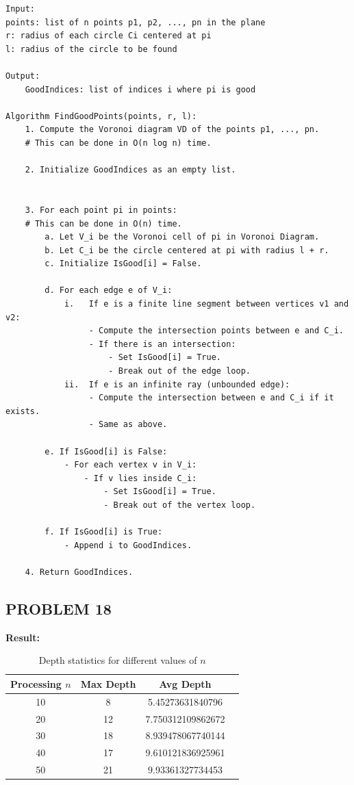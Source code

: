 \documentclass{article}
\begin{document}
\begin{verbatim}
Input: 
points: list of n points p1, p2, ..., pn in the plane
r: radius of each circle Ci centered at pi
l: radius of the circle to be found

Output: 
    GoodIndices: list of indices i where pi is good

Algorithm FindGoodPoints(points, r, l):
    1. Compute the Voronoi diagram VD of the points p1, ..., pn.
    # This can be done in O(n log n) time.

    2. Initialize GoodIndices as an empty list.

    
    3. For each point pi in points:
    # This can be done in O(n) time.
        a. Let V_i be the Voronoi cell of pi in Voronoi Diagram.
        b. Let C_i be the circle centered at pi with radius l + r.
        c. Initialize IsGood[i] = False.

        d. For each edge e of V_i:
            i.   If e is a finite line segment between vertices v1 and v2:
                 - Compute the intersection points between e and C_i.
                 - If there is an intersection:
                     - Set IsGood[i] = True.
                     - Break out of the edge loop.
            ii.  If e is an infinite ray (unbounded edge):
                 - Compute the intersection between e and C_i if it exists.
                 - Same as above.

        e. If IsGood[i] is False:
            - For each vertex v in V_i:
                - If v lies inside C_i:
                    - Set IsGood[i] = True.
                    - Break out of the vertex loop.

        f. If IsGood[i] is True:
            - Append i to GoodIndices.

    4. Return GoodIndices.
\end{verbatim}

\subsection*{PROBLEM 18}

\textbf{Result: }
\\
\begin{table}[h!]
    \centering
    \begin{tabular}{@{}cccc@{}}
    \toprule
    \textbf{Processing \( n \)} & \textbf{Max Depth} & \textbf{Avg Depth} \\ \midrule
    10 & 8  & 5.45273631840796 \\
    20 & 12 & 7.750312109862672 \\
    30 & 18 & 8.939478067740144 \\
    40 & 17 & 9.610121836925961 \\
    50 & 21 & 9.93361327734453 \\ \bottomrule
    \end{tabular}
    \caption{Depth statistics for different values of \( n \)}
\end{table}
\end{document}
